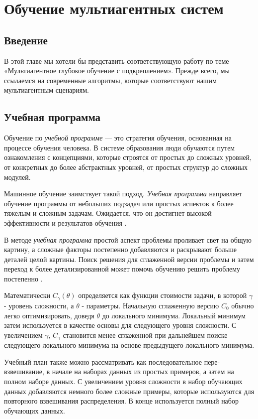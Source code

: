 \chapter{Обучение мультиагентных систем} \label{ch2}

\section{Введение} \label{ch2:intro}

В этой главе мы хотели бы представить соответствующую работу по теме «Мультиагентное глубокое обучение с подкреплением». Прежде всего, мы ссылаемся на современные алгоритмы, которые соответствуют нашим мультиагентным сценариям.




\section{Учебная программа}

Обучение по \textit{учебной программе} — это стратегия обучения, основанная на процессе обучения человека. В системе образования люди обучаются путем ознакомления с концепциями, которые строятся от простых до сложных уровней, от конкретных до более абстрактных уровней, от простых структур до сложных модулей.

Машинное обучение заимствует такой подход. \textit{Учебная программа} направляет обучение программы от небольших подзадач или простых аспектов к более тяжелым и сложным задачам. Ожидается, что он достигнет высокой эффективности и результатов обучения \cite{10.5555/3171837.3172051}.

В методе \textit{учебная программа} простой аспект проблемы проливает свет на общую картину, а сложные факторы постепенно добавляются и раскрывают больше деталей целой картины. Поиск решения для сглаженной версии проблемы и затем переход к более детализированной может помочь обучению решить проблему постепенно \cite{graves2017automated}.

Математически $C_\gamma (\theta)$ определяется как функции стоимости задачи, в которой $\gamma$ - уровень сложности, а $\theta$ - параметры. Начальную сглаженную версию $C_0$ обычно легко оптимизировать, доведя $\theta$ до локального минимума. Локальный минимум затем используется в качестве основы для следующего уровня сложности. С увеличением $\gamma$, $C_\gamma$ становится менее сглаженной при дальнейшем поиске следующего локального минимума на основе предыдущего локального минимума. \cite{10.1145/1553374.1553380}

Учебный план также можно рассматривать как последовательное пере-взвешивание, в начале на наборах данных из простых примеров, а затем на полном наборе данных. С увеличением уровня сложности в набор обучающих данных добавляются немного более сложные примеры, которые используются для повторного взвешивания распределения. В конце используется полный набор обучающих данных. \cite{10.1145/1553374.1553380}

\newpage %
